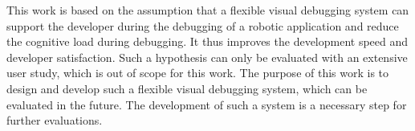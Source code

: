 This work is based on the assumption that a flexible visual debugging system can support the developer during the debugging of a robotic application and reduce the cognitive load during debugging. It thus improves the development speed and developer satisfaction. Such a hypothesis can only be evaluated with an extensive user study, which is out of scope for this work. The purpose of this work is to design and develop such a flexible visual debugging system, which can be evaluated in the future. The development of such a system is a necessary step for further evaluations.


